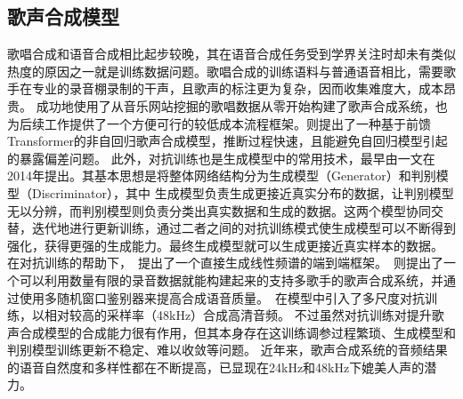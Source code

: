 \subsection{歌声合成模型}
歌唱合成和语音合成相比起步较晚，其在语音合成任务受到学界关注时却未有类似热度的原因之一就是训练数据问题。歌唱合成的训练语料与普通语音相比，需要歌手在专业的录音棚录制的干声，且歌声的标注更为复杂，因而收集难度大，成本昂贵。
\citet{ren2020deepsinger}成功地使用了从音乐网站挖掘的歌唱数据从零开始构建了歌声合成系统，也为后续工作提供了一个方便可行的较低成本流程框架。\citet{blaauw2020sequence}则提出了一种基于前馈Transformer的非自回归歌声合成模型，推断过程快速，且能避免自回归模型引起的暴露偏差问题。
此外，对抗训练也是生成模型中的常用技术，最早由\citet{GAN}一文在2014年提出。其基本思想是将整体网络结构分为生成模型（Generator）和判别模型（Discriminator），其中
生成模型负责生成更接近真实分布的数据，让判别模型无以分辨，而判别模型则负责分类出真实数据和生成的数据。这两个模型协同交替，迭代地进行更新训练，通过二者之间的对抗训练模式使生成模型可以不断得到强化，获得更强的生成能力。最终生成模型就可以生成更接近真实样本的数据。
在对抗训练的帮助下，\citet{lee2019adversarially}~提出了一个直接生成线性频谱的端到端框架。\citet{wu2020adversarially}~则提出了一个可以利用数量有限的录音数据就能构建起来的支持多歌手的歌声合成系统，并通过使用多随机窗口鉴别器来提高合成语音质量。\citet{chen2020hifisinger}~在模型中引入了多尺度对抗训练，以相对较高的采样率（48kHz）合成高清音频。
不过虽然对抗训练对提升歌声合成模型的合成能力很有作用，但其本身存在这训练调参过程繁琐、生成模型和判别模型训练更新不稳定、难以收敛等问题。
近年来，歌声合成系统的音频结果的语音自然度和多样性都在不断提高，已显现在24kHz和48kHz下媲美人声的潜力。
